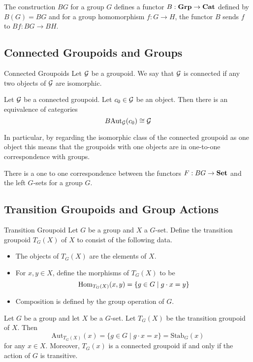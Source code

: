 \documentclass[a4paper]{article}
\begin{document}
\begin{prp}{}{} The construction $BG$ for a group $G$ defines a functor $B:\bold{Grp}\to\bold{Cat}$ defined by $B(G)=BG$ and for a group homomorphism $f:G\to H$, the functor $B$ sends $f$ to $Bf:BG\to BH$. 
\end{prp}

\subsection{Connected Groupoids and Groups}
\begin{defn}{Connected Groupoids}{} Let $\mathcal{G}$ be a groupoid. We say that $\mathcal{G}$ is connected if any two objects of $\mathcal{G}$ are isomorphic. 
\end{defn}

\begin{prp}{}{} Let $\mathcal{G}$ be a connected groupoid. Let $c_0\in\mathcal{G}$ be an object. Then there is an equivalence of categories $$B\text{Aut}_{\mathcal{G}}(c_0)\cong\mathcal{G}$$
\end{prp}

In particular, by regarding the isomorphic class of the connected groupoid as one object this means that the groupoids with one objects are in one-to-one correspondence with groups. 

\begin{thm}{}{} There is a one to one correspondence between the functors $F:BG\to\bold{Set}$ and the left $G$-sets for a group $G$. 
\end{thm}

\subsection{Transition Groupoids and Group Actions}
\begin{defn}{Transition Groupoid}{} Let $G$ be a group and $X$ a $G$-set. Define the transition groupoid $T_G(X)$ of $X$ to consist of the following data. 
\begin{itemize}
\item The objects of $T_G(X)$ are the elements of $X$. 
\item For $x,y\in X$, define the morphisms of $T_G(X)$ to be $$\operatorname{Hom}_{T_G(X)}(x,y)=\{g\in G\;|\;g\cdot x=y\}$$
\item Composition is defined by the group operation of $G$. 
\end{itemize}
\end{defn}

\begin{lmm}{}{} Let $G$ be a group and let $X$ be a $G$-set. Let $T_G(X)$ be the transition groupoid of $X$. Then $$\text{Aut}_{T_G(X)}(x)=\{g\in G\;|\;g\cdot x=x\}=\text{Stab}_G(x)$$ for any $x\in X$. Moreover, $T_G(x)$ is a connected groupoid if and only if the action of $G$ is transitive. 
\end{lmm}
\end{document}
